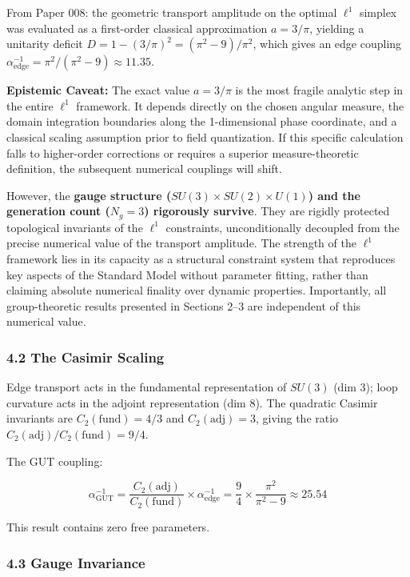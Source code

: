 \documentclass[
]{article}
\begin{document}
From Paper 008: the geometric transport amplitude on the optimal
\(\ell^1\) simplex was evaluated as a first-order classical
approximation \(a = 3/\pi\), yielding a unitarity deficit
\(D = 1 - (3/\pi)^2 = (\pi^2 - 9)/\pi^2\), which gives an edge coupling
\(\alpha_{\mathrm{edge}}^{-1} = \pi^2/(\pi^2 - 9) \approx 11.35\).

\textbf{Epistemic Caveat:} The exact value \(a = 3/\pi\) is the most
fragile analytic step in the entire \(\ell^1\) framework. It depends
directly on the chosen angular measure, the domain integration
boundaries along the 1-dimensional phase coordinate, and a classical
scaling assumption prior to field quantization. If this specific
calculation falls to higher-order corrections or requires a superior
measure-theoretic definition, the subsequent numerical couplings will
shift.

However, the \textbf{gauge structure
(\(SU(3) \times SU(2) \times U(1)\)) and the generation count
(\(N_g=3\)) rigorously survive}. They are rigidly protected topological
invariants of the \(\ell^1\) constraints, unconditionally decoupled from
the precise numerical value of the transport amplitude. The strength of
the \(\ell^1\) framework lies in its capacity as a structural constraint
system that reproduces key aspects of the Standard Model without
parameter fitting, rather than claiming absolute numerical finality over
dynamic properties. Importantly, all group-theoretic results presented
in Sections 2--3 are independent of this numerical value.

\hypertarget{the-casimir-scaling}{%
\subsubsection{4.2 The Casimir Scaling}\label{the-casimir-scaling}}

Edge transport acts in the fundamental representation of \(SU(3)\) (dim
3); loop curvature acts in the adjoint representation (dim 8). The
quadratic Casimir invariants are \(C_2(\mathrm{fund}) = 4/3\) and
\(C_2(\mathrm{adj}) = 3\), giving the ratio
\(C_2(\mathrm{adj})/C_2(\mathrm{fund}) = 9/4\).

The GUT coupling:

\[\alpha_{\mathrm{GUT}}^{-1} = \frac{C_2(\mathrm{adj})}{C_2(\mathrm{fund})} \times \alpha_{\mathrm{edge}}^{-1} = \frac{9}{4} \times \frac{\pi^2}{\pi^2 - 9} \approx 25.54\]

This result contains zero free parameters.

\hypertarget{gauge-invariance}{%
\subsubsection{4.3 Gauge Invariance}\label{gauge-invariance}}
\end{document}
